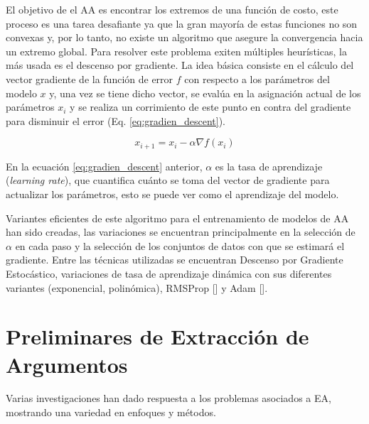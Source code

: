 El objetivo de el AA es encontrar los extremos de una función de costo, este proceso es una tarea 
desafiante ya que la gran mayoría de estas funciones no son convexas y, por lo tanto, no existe un algoritmo
que asegure la convergencia hacia un extremo global. Para resolver este problema exiten múltiples heurísticas,
la más usada es el descenso por gradiente. La idea básica consiste 
en el cálculo del vector gradiente de la función de error $f$ con respecto a los parámetros del modelo $x$ y, una vez se 
tiene dicho vector, se evalúa en la asignación actual de los parámetros $x_i$ y se realiza un corrimiento de este punto 
en contra del gradiente para disminuir el error (Eq. \ref{eq:gradien_descent}).

\begin{equation}
	x_{i+1} = x_i - \alpha \nabla f(x_i)\label{eq:gradien_descent}
\end{equation}

En la ecuación \ref{eq:gradien_descent} anterior, $\alpha$ es la tasa de aprendizaje (\emph{learning rate}),
que cuantifica cuánto se toma del vector de gradiente para actualizar los parámetros, esto 
se puede ver como el aprendizaje del modelo.

Variantes eficientes de este algoritmo para el entrenamiento de modelos de AA han sido 
creadas, las variaciones se encuentran principalmente en la selección de $\alpha$ en cada paso y la 
selección de los conjuntos de datos con que se estimará el gradiente. Entre las técnicas utilizadas se 
encuentran Descenso por Gradiente Estocástico, variaciones de tasa de aprendizaje dinámica con 
sus diferentes variantes (exponencial, polinómica), RMSProp [\cite{tieleman2012rmsp}] 
y Adam [\cite{kingma2014adam}].

\section{Preliminares de Extracción de Argumentos}

Varias investigaciones han dado respuesta a los problemas asociados a EA, mostrando
una variedad en enfoques y métodos.

